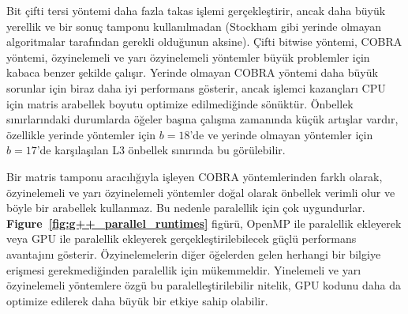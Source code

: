 \documentclass[10pt]{article}
\begin{document}
Bit \c{c}ifti tersi y\"{o}ntemi daha fazla takas i\c{s}lemi ger\c{c}ekle\c{s}tirir, 
ancak daha b\"{u}y\"{u}k yerellik ve bir sonu\c{c} tamponu kullan{\i}lmadan 
(Stockham gibi yerinde olmayan algoritmalar taraf{\i}ndan gerekli 
oldu\u{g}unun aksine). \c{C}ifti bitwise y\"{o}ntemi, COBRA y\"{o}ntemi, \"{o}zyinelemeli 
ve yar{\i} \"{o}zyinelemeli y\"{o}ntemler b\"{u}y\"{u}k problemler i\c{c}in kabaca benzer 
\c{s}ekilde \c{c}al{\i}\c{s}{\i}r. Yerinde olmayan COBRA y\"{o}ntemi daha b\"{u}y\"{u}k 
sorunlar i\c{c}in biraz daha iyi performans g\"{o}sterir, ancak i\c{s}lemci 
kazan\c{c}lar{\i} CPU i\c{c}in matris arabellek boyutu optimize edilmedi\u{g}inde 
s\"{o}n\"{u}kt\"{u}r. \"{O}nbellek s{\i}n{\i}rlar{\i}ndaki durumlarda \"{o}\u{g}eler ba\c{s}{\i}na \c{c}al{\i}\c{s}ma 
zaman{\i}nda k\"{u}\c{c}\"{u}k art{\i}\c{s}lar vard{\i}r, \"{o}zellikle yerinde y\"{o}ntemler 
i\c{c}in $b=18$'de ve yerinde olmayan y\"{o}ntemler i\c{c}in $b=17$'de 
kar\c{s}{\i}la\c{s}{\i}lan L3 \"{o}nbellek s{\i}n{\i}r{\i}nda bu g\"{o}r\"{u}lebilir.

Bir matris tamponu arac{\i}l{\i}\u{g}{\i}yla i\c{s}leyen COBRA y\"{o}ntemlerinden 
farkl{\i} olarak, \"{o}zyinelemeli ve yar{\i} \"{o}zyinelemeli y\"{o}ntemler 
do\u{g}al olarak \"{o}nbellek verimli olur ve b\"{o}yle bir arabellek kullanmaz. 
Bu nedenle paralellik i\c{c}in \c{c}ok uygundurlar. 
{\bf Figure~\ref{fig:g++_parallel_runtimes}} fig\"{u}r\"{u}, OpenMP ile 
paralellik ekleyerek veya GPU ile paralellik ekleyerek 
ger\c{c}ekle\c{s}tirilebilecek g\"{u}\c{c}l\"{u} performans avantaj{\i}n{\i} g\"{o}sterir. 
\"{O}zyinelemelerin di\u{g}er \"{o}\u{g}elerden gelen herhangi bir bilgiye eri\c{s}mesi 
gerekmedi\u{g}inden paralellik i\c{c}in m\"{u}kemmeldir. Yinelemeli ve 
yar{\i} \"{o}zyinelemeli y\"{o}ntemlere \"{o}zg\"{u} bu paralelle\c{s}tirilebilir 
nitelik, GPU kodunu daha da optimize edilerek daha b\"{u}y\"{u}k 
bir etkiye sahip olabilir.
\end{document}
